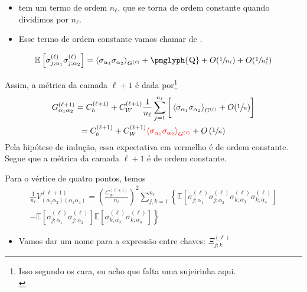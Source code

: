 \documentclass{beamer}
\newcommand{\EE}{\mathbb{E}}
\def\mi#1{{\alpha_{#1}}}
\def\eell{{(\ell)}}
\def\eellum{{(\ell+1)}}
\newcommand{\Gnormal}[3]{{G^{(#1)}_{\mi{#2}\mi{#3}}}}
\newcommand{\Vertice}[5]{V^{(#1)}_{(\mi#2\mi#3)(\mi#4\mi#5)}}
\newcommand{\Expectation}[2]{\left\langle #1 \right\rangle_{#2}}
\begin{document}
\begin{frame}
	\begin{itemize}
		\item  {} tem um termo de ordem $n_\ell$, que se torna de ordem constante quando dividimos por $n_\ell$. 
		\item Esse termo de ordem constante vamos chamar de .
	\end{itemize}
	\begin{equation*}
		\EE\left[\sigma_{j;\mi1}^\eell\sigma_{j;\mi2}^\eell\right] = \Expectation{\sigma_\mi1\sigma_\mi2}{G^\eell} + \text{\pmglyph{Q}} + O(\sfrac{1}{n_\ell}) +  O(\sfrac{1}{n_\ell^2})
	\end{equation*}
\end{frame}


\begin{frame}
	Assim, a métrica da camada $\ell+1$ é dada por\footnote{Isso segundo os cara, eu acho que falta uma sujeirinha  aqui.\\\vspace*{18pt}}
	\begin{multline*} 
		\Gnormal{\ell+1}12 = C_b^\eellum + C_W^\eellum\frac{1}{n_\ell}\sum_{j=1}^{n_\ell} \bigg[\Expectation{\sigma_\mi1\sigma_\mi2}{G^\eell} + O(\sfrac{1}{n}) \bigg] \\
		= C_b^\eellum + C_W^\eellum{\color{red}\Expectation{\sigma_\mi1\sigma_\mi2}{G^\eell} } + O\left(\sfrac{1}{n}\right)
	\end{multline*}
	Pela hipótese de indução, essa expectativa em vermelho é de ordem constante. Segue que a métrica da camada $\ell+1$ é de ordem constante.
\end{frame}

\begin{frame}
	Para o vértice de quatro pontos, temos
	{\small
	\begin{multline*}
		\frac{1}{n_\ell}\Vertice{\ell+1}1234 =  \left(\frac{C_W^\eellum}{n_\ell}\right)^2 \sum_{j,k=1}^{n_\ell}  \left\{ \EE\left[\sigma_{j;\mi1}^\eell\sigma_{j;\mi2}^\eell \sigma_{k;\mi3}^\eell\sigma_{k;\mi4}^\eell\right] \right. \\
		\left. - \EE\left[\sigma_{j;\mi1}^\eell\sigma_{j;\mi2}^\eell\right]\EE\left[\sigma_{k;\mi3}^\eell\sigma_{k;\mi4}^\eell\right]\right\}
	\end{multline*}
	} 
	\begin{itemize}
		\item Vamos dar um nome para a expressão entre chaves:  $\Xi_{j;k}^\eell$
	\end{itemize}
\end{frame}
\end{document}
